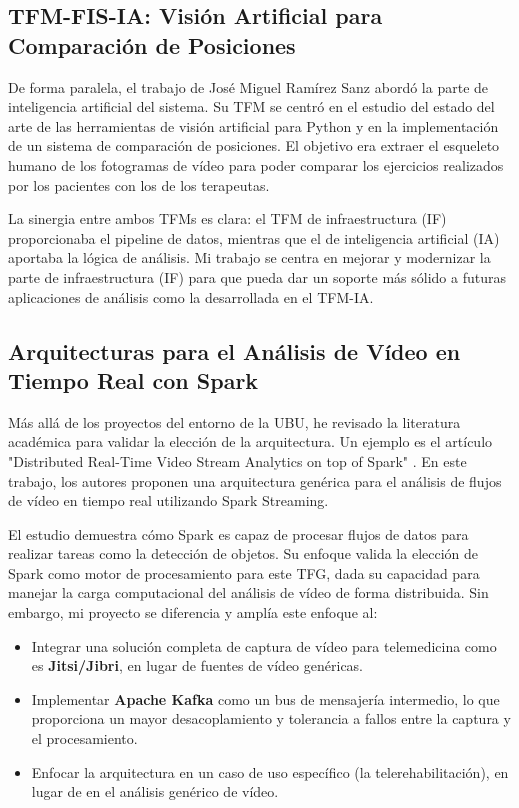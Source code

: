 \subsection{TFM-FIS-IA: Visión Artificial para Comparación de Posiciones}
De forma paralela, el trabajo de José Miguel Ramírez Sanz \cite{ramirez_tfm_ia} abordó la parte de inteligencia artificial del sistema. Su TFM se centró en el estudio del estado del arte de las herramientas de visión artificial para Python y en la implementación de un sistema de comparación de posiciones. El objetivo era extraer el esqueleto humano de los fotogramas de vídeo para poder comparar los ejercicios realizados por los pacientes con los de los terapeutas.

La sinergia entre ambos TFMs es clara: el TFM de infraestructura (IF) proporcionaba el pipeline de datos, mientras que el de inteligencia artificial (IA) aportaba la lógica de análisis. Mi trabajo se centra en mejorar y modernizar la parte de infraestructura (IF) para que pueda dar un soporte más sólido a futuras aplicaciones de análisis como la desarrollada en el TFM-IA.

\subsection{Arquitecturas para el Análisis de Vídeo en Tiempo Real con Spark}
\label{subsec:trab_rel_academico}
Más allá de los proyectos del entorno de la UBU, he revisado la literatura académica para validar la elección de la arquitectura. Un ejemplo es el artículo "Distributed Real-Time Video Stream Analytics on top of Spark" \cite{karimov2018distributed}. En este trabajo, los autores proponen una arquitectura genérica para el análisis de flujos de vídeo en tiempo real utilizando Spark Streaming.

El estudio demuestra cómo Spark es capaz de procesar flujos de datos para realizar tareas como la detección de objetos. Su enfoque valida la elección de Spark como motor de procesamiento para este TFG, dada su capacidad para manejar la carga computacional del análisis de vídeo de forma distribuida. Sin embargo, mi proyecto se diferencia y amplía este enfoque al:
\begin{itemize}
    \item Integrar una solución completa de captura de vídeo para telemedicina como es \textbf{Jitsi/Jibri}, en lugar de fuentes de vídeo genéricas.
    \item Implementar \textbf{Apache Kafka} como un bus de mensajería intermedio, lo que proporciona un mayor desacoplamiento y tolerancia a fallos entre la captura y el procesamiento.
    \item Enfocar la arquitectura en un caso de uso específico (la telerehabilitación), en lugar de en el análisis genérico de vídeo.
\end{itemize}